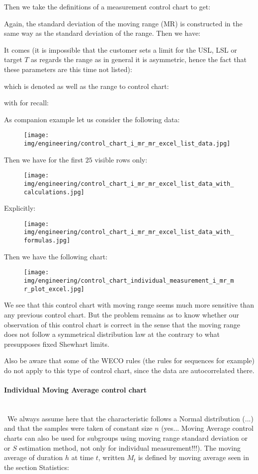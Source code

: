 	Then we take the definitions of a measurement control chart to get:
	
	Again, the standard deviation of the moving range (MR) is constructed in the same way as the standard deviation of the range. Then we have:
	
	It comes (it is impossible that the customer sets a limit for the USL, LSL or target $T$ as regards the range as in general it is asymmetric, hence the fact that these parameters are this time not listed):
	
	which is denoted as well as the range to control chart:
	
	with for recall:
	
	As companion example let us consider the following data:
	\begin{figure}[H]
		\centering
		\texttt{[image: img/engineering/control\_chart\_i\_mr\_mr\_excel\_list\_data.jpg]}
	\end{figure}
	Then we have for the first $25$ visible rows only:
	\begin{figure}[H]
		\centering
		\texttt{[image: img/engineering/control\_chart\_i\_mr\_mr\_excel\_list\_data\_with\_calculations.jpg]}
	\end{figure}
	Explicitly:
	\begin{figure}[H]
		\centering
		\texttt{[image: img/engineering/control\_chart\_i\_mr\_mr\_excel\_list\_data\_with\_formulas.jpg]}
	\end{figure}
	Then we have the following chart:
	\begin{figure}[H]
		\centering
		\texttt{[image: img/engineering/control\_chart\_individual\_measurement\_i\_mr\_mr\_plot\_excel.jpg]}
	\end{figure}
	We see that this control chart with moving range seems much more sensitive than any previous control chart. But the problem remains as to know whether our observation of this control chart is correct in the sense that the moving range does not follow a symmetrical distribution law at the contrary to what presupposes fixed Shewhart limits.

	Also be aware that some of the WECO rules (the rules for sequences for example) do not apply to this type of control chart, since the data are autocorrelated there.
	
	\paragraph{Individual Moving Average control chart}\mbox{}\\\
	We always assume here that the characteristic follows a Normal distribution (...) and that the samples were taken of constant size $n$ (yes... Moving Average control charts can also be used for subgroups using moving range standard deviation or or $S$ estimation method, not only for individual measurement!!!). The moving average of duration $h$ at time $t$, written $M_t$ is defined by moving average seen in the section Statistics:
	

